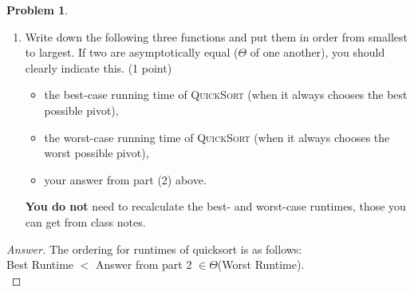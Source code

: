 \documentclass[11pt]{article}
\theoremstyle{definition}
\theoremstyle{definition}
\newtheorem{required}{Problem}
\theoremstyle{definition}
\begin{document}
\begin{required}
\begin{enumerate}
\vspace{1in}

\item Write down the following three functions and put them in order from smallest to largest. If two are asymptotically equal ($\Theta$ of one another), you should clearly indicate this. (1 point)
\begin{itemize}
\item the best-case running time of \textsc{QuickSort} (when it always chooses the best possible pivot), 
\item the worst-case running time of \textsc{QuickSort} (when it always chooses the worst possible pivot), 
\item your answer from part (2) above. 
\end{itemize}
\textbf{You do not} need to recalculate the best- and worst-case runtimes, those you can get from class notes. 
\end{enumerate}

\end{required}


\begin{proof}[Answer]
	The ordering for runtimes of quicksort is as follows:\\
	Best Runtime $<$ Answer from part 2 $\in \Theta$(Worst Runtime).\\
	

\end{proof}

\end{document}
